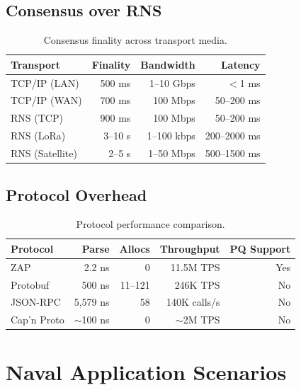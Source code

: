 \documentclass[11pt,letterpaper]{article}
\begin{document}
\subsection{Consensus over RNS}

\begin{table}[H]
\centering
\begin{tabular}{@{}lrrr@{}}
\toprule
\textbf{Transport} & \textbf{Finality} & \textbf{Bandwidth} & \textbf{Latency} \\
\midrule
TCP/IP (LAN) & 500 ms & 1--10 Gbps & $<$1 ms \\
TCP/IP (WAN) & 700 ms & 100 Mbps & 50--200 ms \\
RNS (TCP) & 900 ms & 100 Mbps & 50--200 ms \\
RNS (LoRa) & 3--10 s & 1--100 kbps & 200--2000 ms \\
RNS (Satellite) & 2--5 s & 1--50 Mbps & 500--1500 ms \\
\bottomrule
\end{tabular}
\caption{Consensus finality across transport media.}
\label{tab:consensus-transport}
\end{table}

\subsection{Protocol Overhead}

\begin{table}[H]
\centering
\begin{tabular}{@{}lrrrr@{}}
\toprule
\textbf{Protocol} & \textbf{Parse} & \textbf{Allocs} & \textbf{Throughput} & \textbf{PQ Support} \\
\midrule
ZAP & 2.2 ns & 0 & 11.5M TPS & Yes \\
Protobuf & 500 ns & 11--121 & 246K TPS & No \\
JSON-RPC & 5,579 ns & 58 & 140K calls/s & No \\
Cap'n Proto & $\sim$100 ns & 0 & $\sim$2M TPS & No \\
\bottomrule
\end{tabular}
\caption{Protocol performance comparison.}
\label{tab:protocol-perf}
\end{table}

\section{Naval Application Scenarios}
\end{document}
